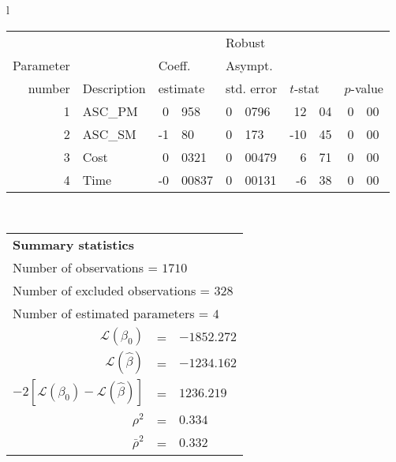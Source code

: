   \begin{tabular}{l}
\begin{tabular}{rlr@{.}lr@{.}lr@{.}lr@{.}l}
         &                       &   \multicolumn{2}{l}{}    & \multicolumn{2}{l}{Robust}  &     \multicolumn{4}{l}{}   \\
Parameter &                       &   \multicolumn{2}{l}{Coeff.}      & \multicolumn{2}{l}{Asympt.}  &     \multicolumn{4}{l}{}   \\
number &  Description                     &   \multicolumn{2}{l}{estimate}      & \multicolumn{2}{l}{std. error}  &   \multicolumn{2}{l}{$t$-stat}  &   \multicolumn{2}{l}{$p$-value}   \\

\hline

1 & ASC_PM  & 0&958 & 0&0796 & 12&04 & 0&00\\
2 & ASC_SM & -1&80 & 0&173 & -10&45 & 0&00\\
3 & Cost & 0&0321 & 0&00479 & 6&71 & 0&00\\
4 & Time & -0&00837 & 0&00131 & -6&38 & 0&00\\
\hline
\end{tabular}
\\
\begin{tabular}{rcl}
\multicolumn{3}{l}{\bf Summary statistics}\\
\multicolumn{3}{l}{ Number of observations = $1710$} \\
\multicolumn{3}{l}{ Number of excluded observations = $328$} \\
\multicolumn{3}{l}{ Number of estimated  parameters = $4$} \\
 $\mathcal{L}(\beta_0)$ &=&  $-1852.272$ \\
 $\mathcal{L}(\hat{\beta})$ &=& $-1234.162 $  \\
 $-2[\mathcal{L}(\beta_0) -\mathcal{L}(\hat{\beta})]$ &=& $1236.219$ \\
    $\rho^2$ &=&   $0.334$ \\
    $\bar{\rho}^2$ &=&    $0.332$ \\
\end{tabular}
  \end{tabular}
